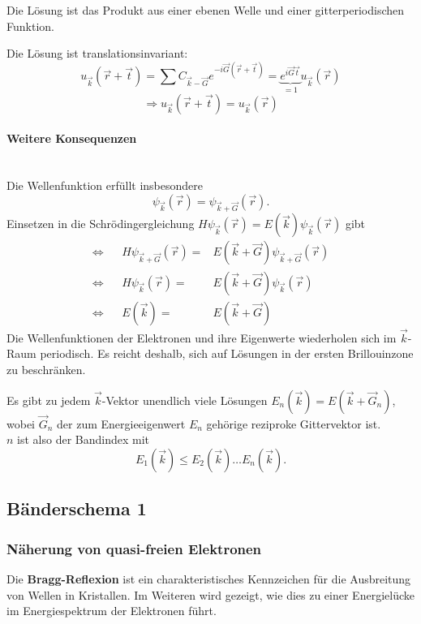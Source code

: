 Die Lösung ist das Produkt aus einer ebenen Welle und einer gitterperiodischen Funktion.

Die Lösung ist translationsinvariant:
$$
u_{\Vec{k}}(\Vec{r} + \Vec{t}) = \sum_{}^{} C_{\Vec{k}-\Vec{G}} e^{-i\Vec{G}(\Vec{r}+\Vec{t})} = \underbrace{e^{i\Vec{G}\Vec{t}}}_{=1} u_{\Vec{k}}(\Vec{r}) 
$$
$$
\Rightarrow u_{\Vec{k}}(\Vec{r}+\Vec{t}) = u_{\Vec{k}}(\Vec{r})
$$ 

\paragraph{Weitere Konsequenzen}\,\\ 
Die Wellenfunktion erfüllt insbesondere
\begin{equation}
	\label{eq:II.8.11}
	\psi_{\Vec{k}}(\Vec{r}) = \psi_{\Vec{k}+\Vec{G}} (\Vec{r}).
\end{equation}
Einsetzen in die Schrödingergleichung $H\psi_{\Vec{k}}(\Vec{r}) = E(\Vec{k}) \psi_{\Vec{k}}(\Vec{r})$ gibt
\begin{align}
	\nonumber
	\Leftrightarrow&& H \psi_{\Vec{k}+\Vec{G}} (\Vec{r}) =& E(\Vec{k}+\Vec{G}) \psi_{\Vec{k}+\Vec{G}}(\Vec{r})\\
	\nonumber
	\Leftrightarrow&&  H \psi_{\Vec{k}}(\Vec{r}) =& E(\Vec{k}+\Vec{G}) \psi_{\Vec{k}}(\Vec{r})\\
	\label{eq:II.8.12}
	\Leftrightarrow&&  E(\Vec{k}) =& E(\Vec{k} + \Vec{G})
\end{align}
Die Wellenfunktionen der Elektronen und ihre Eigenwerte wiederholen sich im $\Vec{k}$-Raum periodisch. 
Es reicht deshalb, sich auf Lösungen in der ersten Brillouinzone zu beschränken.

Es gibt zu jedem $\Vec{k}$-Vektor unendlich viele Lösungen $E_{n}(\Vec{k}) = E(\Vec{k}+\Vec{G}_{n})$, wobei $\Vec{G}_{n}$ der zum Energieeigenwert $E_{n}$ gehörige reziproke Gittervektor ist.\\
$n$ ist also der Bandindex mit
$$
E_{1}(\Vec{k}) \le E_2(\Vec{k}) \ldots E_{n}(\Vec{k}).
$$ 

\subsection{Bänderschema 1}
\subsubsection{Näherung von quasi-freien Elektronen}
Die \textbf{Bragg-Reflexion} ist ein charakteristisches Kennzeichen für die Ausbreitung von Wellen in Kristallen.
Im Weiteren wird gezeigt, wie dies zu einer Energielücke im Energiespektrum der Elektronen führt.

